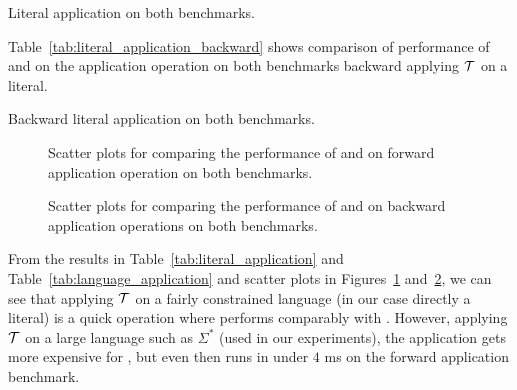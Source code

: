\begin{table}[ht]
  \centering
  
  \caption{
    Literal application on both benchmarks.
  }
  \label{tab:literal_application}
\end{table}

Table~\ref{tab:literal_application_backward} shows comparison of performance of \mata and \mona on the application operation on both benchmarks backward applying $\mathcal{T}$ on a literal.

\begin{table}[ht]
  \centering
  
  \caption{
    Backward literal application on both benchmarks.
  }
  \label{tab:literal_application_backward}
\end{table}

\begin{figure}[ht]
    \centering
    \quad
    \caption{
      Scatter plots for comparing the performance of \mata and \mona on forward application operation on both benchmarks.
    }
    \label{fig:apply_operation}%
\end{figure}

\begin{figure}[ht]
    \centering
    \quad
    \caption{
      Scatter plots for comparing the performance of \mata and \mona on backward application operations on both benchmarks.
    }
    \label{fig:apply_operation_backward}%
\end{figure}

From the results in Table~\ref{tab:literal_application} and Table~\ref{tab:language_application} and scatter plots in Figures~\ref{fig:apply_operation} and~\ref{fig:apply_operation_backward}, we can see that applying $\mathcal{T}$ on a fairly constrained language (in our case directly a literal) is a quick operation where \mata performs comparably with \mona.
However, applying $\mathcal{T}$ on a large language such as $\Sigma^*$ (used in our experiments), the application gets more expensive for \mata, but even then \mata runs in under $4$ ms on the forward application benchmark.

